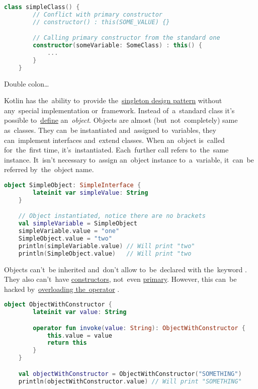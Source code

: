 \begin{lstlisting}[language=Kotlin]
    class simpleClass() {
        // Conflict with primary constructor
        // constructor() : this(SOME_VALUE) {}

        // Calling primary constructor from the standard one
        constructor(someVariable: SomeClass) : this() {
            ...
        }
    }
\end{lstlisting}

\label{kotlinoperatoroverload}

\label{kotlincallablereference}
Double colon\dots

\label{kotlinobject}
Kotlin has the~ability to~provide the~\hyperref[singletondp]{singleton design pattern} without any~special implementation or~framework.
Instead of~a~standard class it's possible to~\hyperref[declarationdefinition]{define} an~\textit{object}.
Objects are almost (but~not~completely) same as~classes.
They can~be instantiated and~assigned to~variables, they can~implement interfaces and~extend classes.
When an~object is~called for~the~first time, it's~instantiated.
Each~further call refers to~the~same instance.
It~isn't necessary to~assign an~object instance to~a~variable, it~can~be referred by~the~object name.

\begin{lstlisting}[language=Kotlin]
    object SimpleObject: SimpleInterface {
        lateinit var simpleValue: String
    }

    // Object instantiated, notice there are no brackets
    val simpleVariable = SimpleObject
    simpleVariable.value = "one"
    SimpleObject.value = "two"
    println(simpleVariable.value) // Will print "two"
    println(SimpleObject.value)   // Will print "two
\end{lstlisting}

\noindent Objects can't~be inherited and~don't allow to~be~declared with the~keyword .
They also can't~have \hyperref[kotlinconstructor]{constructors}, not~even \hyperref[kotlinprimaryconstructor]{primary}.
However, this can~be hacked by~\hyperref[kotlinoperatoroverload]{overloading the~operator} .

\begin{lstlisting}[language=Kotlin]
    object ObjectWithConstructor {
        lateinit var value: String

        operator fun invoke(value: String): ObjectWithConstructor {
            this.value = value
            return this
        }
    }

    val objectWithConstructor = ObjectWithConstructor("SOMETHING")
    println(objectWithConstructor.value) // Will print "SOMETHING"
\end{lstlisting}
\newline

